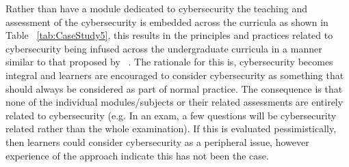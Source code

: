 \documentclass[conference]{IEEEtran}
\begin{document}
Rather than have a module dedicated to cybersecurity the teaching and assessment of the cybersecurity is embedded across the curricula as shown in Table ~\ref{tab:CaseStudy5}, this results in the principles and practices related to cybersecurity being infused across the undergraduate curricula in a manner similar to that proposed by ~\cite{Blair2020}. The rationale for this is, cybersecurity becomes integral and learners are encouraged  to consider cybersecurity as something that should always be considered as part of normal practice. The consequence is that none of the individual modules/subjects or their related assessments are entirely related to cybersecurity (e.g. In an exam, a few questions will be cybersecurity related rather than the whole examination). If this is evaluated pessimistically, then learners could consider cybersecurity as a peripheral issue, however experience of the approach indicate this has not been the case.
\end{document}
